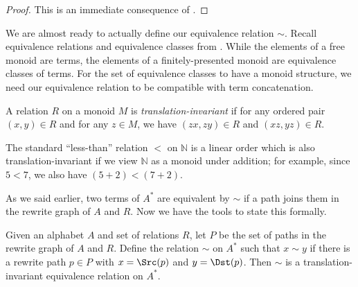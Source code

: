 \documentclass[../generics]{subfiles}
\begin{document}
\begin{proof}
This is an immediate consequence of .
\end{proof}

We are almost ready to actually define our equivalence relation $\sim$. Recall equivalence relations and equivalence classes from . While the elements of a free monoid are terms, the elements of a finitely-presented monoid are equivalence classes of terms. For the set of equivalence classes to have a monoid structure, we need our equivalence relation to be compatible with term concatenation.
\begin{definition}
%
A relation $R$ on a monoid $M$ is \emph{translation-invariant} if for any ordered pair $(x,y)\in R$ and for any $z\in M$, we have $(zx,zy)\in R$ and $(xz,yz)\in R$.
\end{definition}
\begin{example}
The standard ``less-than'' relation $<$ on $\mathbb{N}$ is a linear order which is also translation-invariant if we view $\mathbb{N}$ as a monoid under addition; for example, since $5<7$, we also have $(5+2)<(7+2)$.
\end{example}
As we said earlier, two terms of $A^*$ are equivalent by $\sim$ if a path joins them in the rewrite graph of $A$ and $R$. Now we have the tools to state this formally.
\begin{proposition}\label{monoid congruence}
Given an alphabet $A$ and set of relations $R$, let $P$ be the set of paths in the rewrite graph of $A$ and $R$. Define the relation \index{$\sim$}$\sim$ on $A^*$ such that $x\sim y$ if there is a rewrite path $p\in P$ with $x=\Src(p)$ and $y=\Dst(p)$. Then $\sim$ is a translation-invariant equivalence relation on $A^*$.
\end{proposition}
\end{document}
